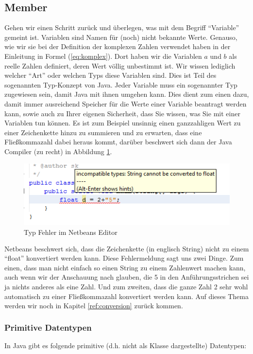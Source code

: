 \subsection{Member}
Gehen wir einen Schritt zurück und überlegen, was mit dem Begriff "`Variable"' gemeint ist. Variablen sind Namen für (noch) nicht bekannte Werte. Genauso, wie wir sie bei der Definition der komplexen Zahlen verwendet haben in der Einleitung in Formel (\ref{eq:komplex}). Dort haben wir die Variablen $a$ und $b$ als reelle Zahlen definiert, deren Wert völlig unbestimmt ist. Wir wissen lediglich welcher "`Art"' oder welchen Typs diese Variablen sind. Dies ist Teil des sogenannten Typ-Konzept von Java. Jeder Variable muss ein sogenannter Typ zugewiesen sein, damit Java mit ihnen umgehen kann. Dies dient zum einen dazu, damit immer ausreichend Speicher für die Werte einer Variable beantragt werden kann, sowie auch zu Ihrer eigenen Sicherheit, dass Sie wissen, was Sie mit einer Variablen tun können. Es ist zum Beispiel unsinnig einen ganzzahligen Wert zu einer Zeichenkette hinzu zu summieren und zu erwarten, dass eine Fließkommazahl dabei heraus kommt, darüber beschwert sich dann der Java Compiler (zu recht) in Abbildung \ref{nb:typeerror}.

\begin{figure}[h]
\centering
\includegraphics[]{img/nb004}
\caption{Typ Fehler im Netbeans Editor}
\label{nb:typeerror}
\end{figure}

Netbeans beschwert sich, dass die Zeichenkette (in englisch String) nicht zu einem "`float"' konvertiert werden kann. Diese Fehlermeldung sagt uns zwei Dinge. Zum einen, dass man nicht einfach so einen String zu einem Zahlenwert machen kann, auch wenn wir der Anschauung nach glauben, die 5 in den Anführungsstrichen sei ja nichts anderes als eine Zahl. Und zum zweiten, dass die ganze Zahl 2 sehr wohl automatisch zu einer Fließkommazahl konvertiert werden kann. Auf dieses Thema werden wir noch in Kapitel \ref{ref:conversion} zurück kommen.

\subsubsection{Primitive Datentypen}
In Java gibt es folgende primitive (d.h. nicht als Klasse dargestellte) Datentypen:


